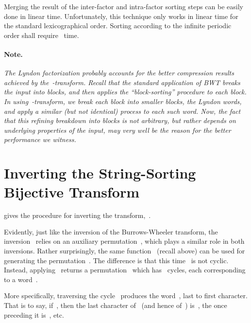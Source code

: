 \documentclass[a4paper,12pt]{article}
\newcommand{\alg}[1]{{\textup{\textsf{#1}}}}
\numberwithin{algorithm}{section}
\begin{document}
Merging the result of the inter-factor and intra-factor sorting steps
  can be easily done in linear time.
Unfortunately, this technique only works in linear time
   for the standard lexicographical
  order.
Sorting according to the infinite periodic order shall require~
  time.

\paragraph{Note.}\sl The Lyndon factorization probably accounts for the better compression
  results achieved by the~-transform.
Recall that the standard application of BWT breaks the input into blocks, and then applies the “block-sorting'' procedure to each block.
In using~-transform, we break each block into smaller blocks, the Lyndon words, and apply a similar (but not identical) process
to each such word.
Now, the fact that this refining breakdown into blocks is not arbitrary, but rather depends on underlying properties of the input,
  may very well be the reason for the better performance we witness.
\vspace{5pt}\rm


\section{Inverting the String-Sorting Bijective Transform}
\label{Section:IBWTS}
 gives
  the procedure for inverting the transform,~.

\begin{algorithm}[!hbt]
\caption{
   }
\label{Algorithm:Inverse:Acronym}
\begin{algorithmic}[1]
\LET{θ}{\alg{Match}(η)}
\RETURN
\end{algorithmic}
\end{algorithm}

Evidently, just like the inversion of the
  Burrows-Wheeler transform, the inversion~
  relies on an auxiliary permutation~, which plays a similar role
  in both inversions.
Rather surprisingly, the same function~
  (recall  above)
  can be used for generating the permutation~.
The difference is that this time~ is not cyclic.
Instead, applying~ returns a permutation~ which
  has~ cycles, each corresponding to a word~.

More specifically, traversing the cycle~ produces the
  word~, last to first character.
That is to say, if~,
  then the last character of~ (and hence of~)
  is~, the once preceding it is~, etc.
\end{document}

